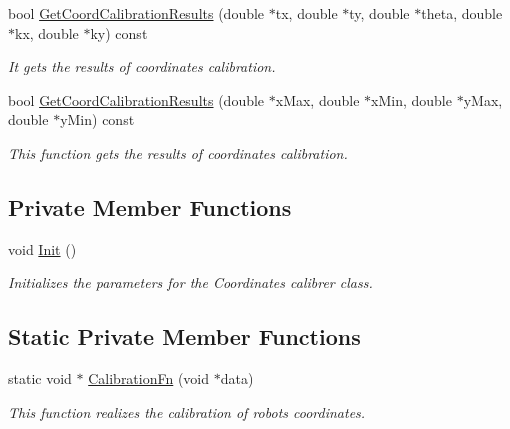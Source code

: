 \begin{DoxyCompactItemize}
bool \hyperlink{classCoordinatesCalibrer_a92672252bda26bddd9b8c73bc6395ea3}{GetCoordCalibrationResults} (double $\ast$tx, double $\ast$ty, double $\ast$theta, double $\ast$kx, double $\ast$ky) const 
\begin{DoxyCompactList}\small\item\em It gets the results of coordinates calibration. \item\end{DoxyCompactList}\item 
bool \hyperlink{classCoordinatesCalibrer_a1a3ae703556c2f4c4455792a43fed987}{GetCoordCalibrationResults} (double $\ast$xMax, double $\ast$xMin, double $\ast$yMax, double $\ast$yMin) const 
\begin{DoxyCompactList}\small\item\em This function gets the results of coordinates calibration. \item\end{DoxyCompactList}\end{DoxyCompactItemize}
\subsection*{Private Member Functions}
\begin{DoxyCompactItemize}
\item 
void \hyperlink{classCoordinatesCalibrer_a19faab9e443f7ef64462a36c19baf6bc}{Init} ()
\begin{DoxyCompactList}\small\item\em Initializes the parameters for the Coordinates calibrer class. \item\end{DoxyCompactList}\end{DoxyCompactItemize}
\subsection*{Static Private Member Functions}
\begin{DoxyCompactItemize}
\item 
static void $\ast$ \hyperlink{classCoordinatesCalibrer_a4ce4c153ae8c3e50faccfba40e6bc4ea}{CalibrationFn} (void $\ast$data)
\begin{DoxyCompactList}\small\item\em This function realizes the calibration of robots coordinates. \item\end{DoxyCompactList}\end{DoxyCompactItemize}
